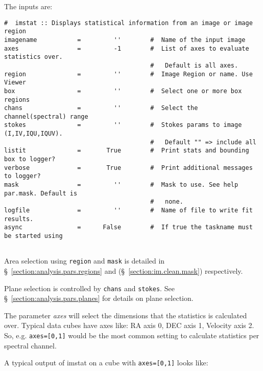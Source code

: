 The inputs are:
\small
\begin{verbatim}
#  imstat :: Displays statistical information from an image or image region
imagename           =         ''        #  Name of the input image
axes                =         -1        #  List of axes to evaluate statistics over.
                                        #   Default is all axes.
region              =         ''        #  Image Region or name. Use Viewer
box                 =         ''        #  Select one or more box regions
chans               =         ''        #  Select the channel(spectral) range
stokes              =         ''        #  Stokes params to image (I,IV,IQU,IQUV).
                                        #   Default "" => include all
listit              =       True        #  Print stats and bounding box to logger?
verbose             =       True        #  Print additional messages to logger?
mask                =         ''        #  Mask to use. See help par.mask. Default is
                                        #   none.
logfile             =         ''        #  Name of file to write fit results.
async               =      False        #  If true the taskname must be started using
              
\end{verbatim}
\normalsize

Area selection using {\tt region} and {\tt mask} is detailed in 
\S~\ref{section:analysis.pars.regions} and
(\S~\ref{section:im.clean.mask}) respectively.

Plane selection is controlled by {\tt chans} and {\tt stokes}.
See \S~\ref{section:analysis.pars.planes} for details on plane
selection.

The parameter {\it axes} will select the dimensions that the
statistics is calculated over. Typical data cubes have axes like: RA
axis 0, DEC axis 1, Velocity axis 2. So, e.g. {\tt axes=[0,1]} would
be the most common setting to calculate statistics per spectral
channel.

A typical output of imstat on a cube with {\tt axes=[0,1]} looks
like:

